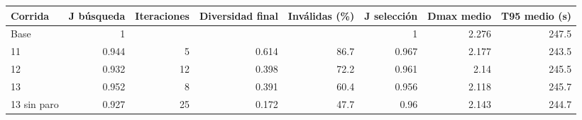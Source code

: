 \begin{tabular}{lrrrrrrr}
\toprule
Corrida & J búsqueda & Iteraciones & Diversidad final & Inválidas (\%) & J selección & Dmax medio & T95 medio (s) \\
\midrule
Base & 1 &  &  &  & 1 & 2.276 & 247.5 \\
11 & 0.944 & 5 & 0.614 & 86.7 & 0.967 & 2.177 & 243.5 \\
12 & 0.932 & 12 & 0.398 & 72.2 & 0.961 & 2.14 & 245.5 \\
13 & 0.952 & 8 & 0.391 & 60.4 & 0.956 & 2.118 & 245.7 \\
13 sin paro & 0.927 & 25 & 0.172 & 47.7 & 0.96 & 2.143 & 244.7 \\
\bottomrule
\end{tabular}
